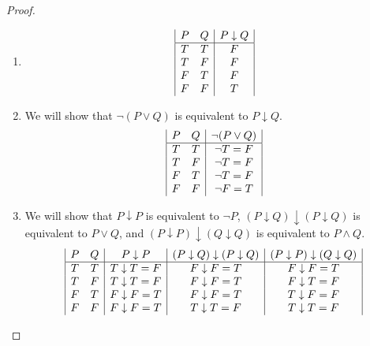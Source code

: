 \documentclass[12pt]{amsart}
\theoremstyle{definition}
\theoremstyle{remark}
\begin{document}
\begin{proof}
\hfill
\begin{enumerate}
	\item
	\begin{equation*}
		\begin{array}{| c c | c |}
			P & Q & P \downarrow Q \\
			\hline
			T & T & F \\
			T & F & F \\
			F & T & F \\
			F & F & T
		\end{array}
	\end{equation*}
	
	\item We will show that $\neg (P \vee Q)$ is equivalent to $P \downarrow Q$.
	\begin{equation*}
		\begin{array}{| c c | c |}
			P & Q & \neg (P \vee Q) \\
			\hline
			T & T & \neg T = F \\
			T & F & \neg T = F \\
			F & T & \neg T = F \\
			F & F & \neg F = T
		\end{array}
	\end{equation*}
	
	\item We will show that $P \downarrow P$ is equivalent to $\neg P$, $(P \downarrow Q) \downarrow (P \downarrow Q)$ is equivalent to $P \vee Q$, and $(P \downarrow P) \downarrow (Q \downarrow Q)$ is equivalent to $P \wedge Q$.
	\begin{equation*}
		\begin{array}{| c c | c | c | c |}
			P & Q & P \downarrow P & (P \downarrow Q) \downarrow (P \downarrow Q) 
			& (P \downarrow P) \downarrow (Q \downarrow Q) \\
			\hline
			T & T & T \downarrow T = F & F \downarrow F = T & F \downarrow F = T \\
			T & F & T \downarrow T = F & F \downarrow F = T & F \downarrow T = F \\
			F & T & F \downarrow F = T & F \downarrow F = T & T \downarrow F = F \\
			F & F & F \downarrow F = T & T \downarrow T = F & T \downarrow T = F
		\end{array}
	\end{equation*}
\end{enumerate}
\end{proof}
\end{document}
